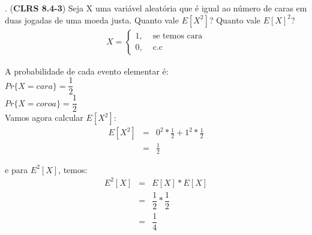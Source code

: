 
. (\textbf{CLRS 8.4-3}) Seja X uma variável aleatória que é igual ao número de caras em duas jogadas de uma moeda justa. Quanto vale $E[X^2]$? Quanto vale $E[X]^2$?\\[6pt]

\begin{eqnarray*}
X = \left\{ \begin{array}{rl} 
 1, &\mbox{ se temos cara} \\
 0, &\mbox{ c.c}
       \end{array} \right.
\end{eqnarray*}

A probabilidade de cada evento elementar é:\\
$Pr\{X = cara\} = \dfrac{1}{2}$\\
$Pr\{X = coroa\} = \dfrac{1}{2}$\\

Vamos agora calcular $E[X^2]$:
\begin{eqnarray*}
  E[X^2] &=& 0^2 * \frac{1}{2} + 1^2 * \frac{1}{2}  \\
  &=& \frac{1}{2}
\end{eqnarray*}

e para $E^2[X]$, temos:
\begin{eqnarray*}
E^2[X] &=& E[X]*E[X] \\
&=& \dfrac{1}{2} * \dfrac{1}{2}\\
&=& \dfrac{1}{4}
\end{eqnarray*}